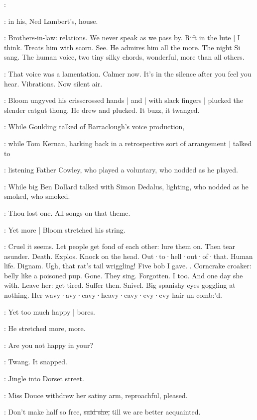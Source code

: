 \simon:

:
in his,
Ned Lambert's,
house.

\BloomInt:
Brothers-in-law:
relations.
We never speak as we pass by.
Rift in the lute |
I think.
Treats him with scorn.
See.
He admires him all the more.
The night Si sang.
The human voice,
two tiny silky chords,
wonderful,
more than all others.

\BloomInt:
That voice was a lamentation.
Calmer now.
It's in the silence after
you feel you hear.
Vibrations.
Now silent air.

:
Bloom ungyved his crisscrossed hands |
and |
with slack fingers |
plucked the slender catgut thong.
He drew and plucked.
It buzz,
it twanged.

:
While Goulding talked of Barraclough's voice production,

:
while Tom Kernan,
harking back in a retrospective sort of arrangement |
talked to 

:
listening Father Cowley,
who played a voluntary,
who nodded as he played.

:
While big Ben Dollard talked with Simon Dedalus,
lighting,
who nodded as he smoked,
who smoked.

\BloomInt:
Thou lost one.
All songs on that theme.

:
Yet more |
Bloom stretched his string.

\BloomInt:
Cruel it seems.
Let people get fond of each other:
lure them on.
Then tear asunder.
Death.
Explos.
Knock on the head.
Out·to·hell·out·of·that.
Human life.
Dignam.
Ugh,
that rat's tail wriggling!
Five bob I gave.
.
Corncrake croaker:
belly like a poisoned pup.
Gone.
They sing.
Forgotten.
I too.
And one day she with.
Leave her:
get tired.
Suffer then.
Snivel.
Big spanishy eyes goggling at nothing.
Her wavy·avy·eavy·heavy·eavy·evy·evy hair un comb:'d.

\BloomInt:
Yet too much happy |
bores.

:
He stretched more,
more.

\BloomInt:
Are you not happy in your?

:
Twang.
It snapped.

:
Jingle into Dorset street.

:
Miss Douce withdrew her satiny arm,
reproachful,
pleased.

\MissD:
Don't make half so free,
\sout{said she,}
till we are better acquainted.

